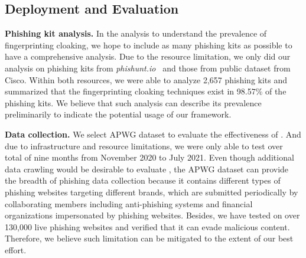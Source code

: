 

\subsection{\spartacus Deployment and Evaluation}

\noindent
\textbf{Phishing kit analysis.}
In the analysis to understand the prevalence of fingerprinting cloaking, we hope to include as many phishing kits as possible to have a comprehensive analysis.
Due to the resource limitation, we only did our analysis on phishing kits from \emph{phishunt.io}~\cite{phishunt} and those from public dataset from Cisco.
Within both resources, we were able to analyze 2,657 phishing kits and summarized that the fingerprinting cloaking techniques exist in 98.57\% of the phishing kits.
We believe that such analysis can describe its prevalence preliminarily to indicate the potential usage of our \spartacus framework.


\noindent
\textbf{Data collection.}
We select APWG dataset to evaluate the effectiveness of \spartacus.
And due to infrastructure and resource limitations, we were only able to test \spartacus over total of nine months from November 2020 to July 2021.
Even though additional data crawling would be desirable to evaluate \spartacus,
the APWG dataset can provide the breadth of phishing data collection because it contains different types of phishing websites targeting different brands, which are submitted periodically by collaborating members including anti-phishing systems and financial organizations impersonated by phishing websites.
Besides, we have tested \spartacus on over 130,000 live phishing websites and verified that it can evade malicious content.
Therefore, we believe such limitation can be mitigated to the extent of our best effort.

